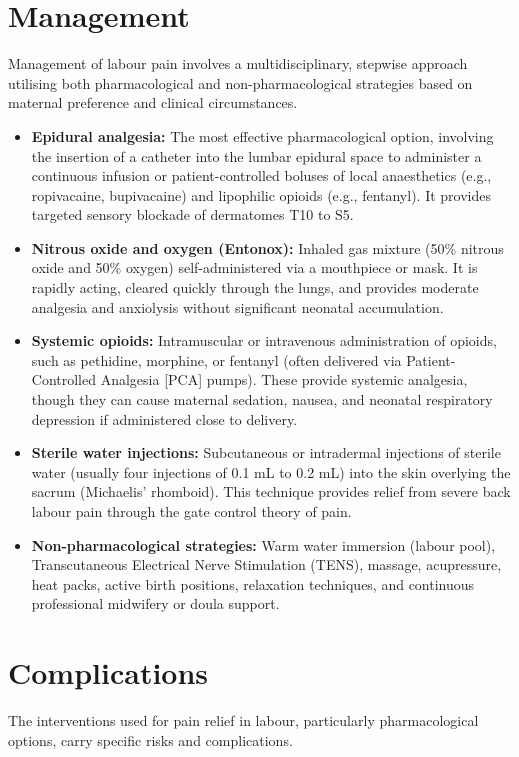 \section*{Management}
Management of labour pain involves a multidisciplinary, stepwise approach utilising both pharmacological and non-pharmacological strategies based on maternal preference and clinical circumstances.

\begin{itemize}
    \item \textbf{Epidural analgesia:} The most effective pharmacological option, involving the insertion of a catheter into the lumbar epidural space to administer a continuous infusion or patient-controlled boluses of local anaesthetics (e.g., ropivacaine, bupivacaine) and lipophilic opioids (e.g., fentanyl). It provides targeted sensory blockade of dermatomes T10 to S5.
    \item \textbf{Nitrous oxide and oxygen (Entonox):} Inhaled gas mixture (50\% nitrous oxide and 50\% oxygen) self-administered via a mouthpiece or mask. It is rapidly acting, cleared quickly through the lungs, and provides moderate analgesia and anxiolysis without significant neonatal accumulation.
    \item \textbf{Systemic opioids:} Intramuscular or intravenous administration of opioids, such as pethidine, morphine, or fentanyl (often delivered via Patient-Controlled Analgesia [PCA] pumps). These provide systemic analgesia, though they can cause maternal sedation, nausea, and neonatal respiratory depression if administered close to delivery.
    \item \textbf{Sterile water injections:} Subcutaneous or intradermal injections of sterile water (usually four injections of 0.1 mL to 0.2 mL) into the skin overlying the sacrum (Michaelis' rhomboid). This technique provides relief from severe back labour pain through the gate control theory of pain.
    \item \textbf{Non-pharmacological strategies:} Warm water immersion (labour pool), Transcutaneous Electrical Nerve Stimulation (TENS), massage, acupressure, heat packs, active birth positions, relaxation techniques, and continuous professional midwifery or doula support.
\end{itemize}

\section*{Complications}
The interventions used for pain relief in labour, particularly pharmacological options, carry specific risks and complications.

